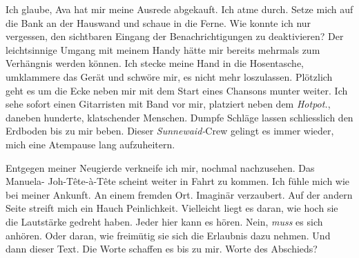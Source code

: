 Ich glaube, Ava hat mir meine Ausrede abgekauft. Ich atme durch. Setze
mich auf die Bank an der Hauswand und schaue in die Ferne. Wie konnte ich nur vergessen, den sichtbaren Eingang der Benachrichtigungen zu deaktivieren? Der
leichtsinnige Umgang mit meinem Handy hätte mir bereits mehrmals zum
Verhängnis werden können. Ich stecke meine Hand in die Hosentasche,
umklammere das Gerät und schwöre mir, es nicht mehr loszulassen.
Plötzlich geht es um die Ecke neben mir mit dem Start eines Chansons
munter weiter. Ich sehe sofort einen Gitarristen mit Band vor mir, platziert neben dem
\emph{Hotpot.}, daneben hunderte, klatschender Menschen. Dumpfe Schläge lassen schliesslich den Erdboden bis zu mir 
beben. Dieser \emph{Sunnewaid-}Crew gelingt es immer wieder, mich eine Atempause lang
aufzuheitern.


Entgegen meiner Neugierde verkneife ich mir, nochmal nachzusehen. Das
Manuela- Joh-Tête-à-Tête scheint weiter in Fahrt zu kommen. Ich fühle
mich wie bei meiner Ankunft. An einem fremden Ort. Imaginär verzaubert.
Auf der andern Seite streift mich ein Hauch Peinlichkeit. Vielleicht
liegt es daran, wie hoch sie die Lautstärke gedreht haben. Jeder hier
kann es hören. Nein, \emph{muss} es sich anhören. Oder daran, wie
freimütig sie sich die Erlaubnis dazu nehmen. Und dann dieser Text. Die
Worte schaffen es bis zu mir. Worte des Abschieds?


